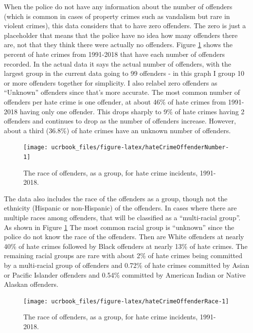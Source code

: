 \documentclass[
  12pt,
  openany]{book}
\begin{document}
When the police do not have any information about the number of offenders (which is common in cases of property crimes such as vandalism but rare in violent crimes), this data considers that to have zero offenders. The zero is just a placeholder that means that the police have no idea how many offenders there are, not that they think there were actually no offenders. Figure \ref{fig:hateCrimeOffenderNumber} shows the percent of hate crimes from 1991-2018 that have each number of offenders recorded. In the actual data it says the actual number of offenders, with the largest group in the current data going to 99 offenders - in this graph I group 10 or more offenders together for simplicity. I also relabel zero offenders as ``Unknown'' offenders since that's more accurate. The most common number of offenders per hate crime is one offender, at about 46\% of hate crimes from 1991-2018 having only one offender. This drops sharply to 9\% of hate crimes having 2 offenders and continues to drop as the number of offenders increase. However, about a third (36.8\%) of hate crimes have an unknown number of offenders.

\begin{figure}

{\centering \texttt{[image: ucrbook\_files/figure-latex/hateCrimeOffenderNumber-1]} 

}

\caption{The race of offenders, as a group, for hate crime incidents, 1991-2018.}\label{fig:hateCrimeOffenderNumber}
\end{figure}

The data also includes the race of the offenders as a group, though not the ethnicity (Hispanic or non-Hispanic) of the offenders. In cases where there are multiple races among offenders, that will be classified as a ``multi-racial group''. As shown in Figure \ref{fig:hateCrimeOffenderNumber} The most common racial group is ``unknown'' since the police do not know the race of the offenders. Then are White offenders at nearly 40\% of hate crimes followed by Black offenders at nearly 13\% of hate crimes. The remaining racial groups are rare with about 2\% of hate crimes being committed by a multi-racial group of offenders and 0.72\% of hate crimes committed by Asian or Pacific Islander offenders and 0.54\% committed by American Indian or Native Alaskan offenders.

\begin{figure}

{\centering \texttt{[image: ucrbook\_files/figure-latex/hateCrimeOffenderRace-1]} 

}

\caption{The race of offenders, as a group, for hate crime incidents, 1991-2018.}\label{fig:hateCrimeOffenderRace}
\end{figure}

\backmatter

  
\end{document}
